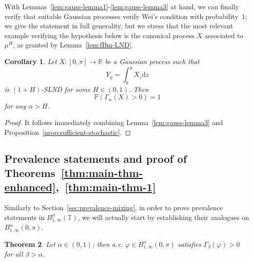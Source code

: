 \documentclass[11pt,oneside,reqno]{amsart}
\newcommand{\mathd}{\mathrm{d}}
\newtheorem{theorem}{Theorem}[section]
\newtheorem{corollary}[theorem]{Corollary}
\numberwithin{equation}{section}
\begin{document}
With Lemmas~\ref{lem:gauss-lemma1}\mbox{-}\ref{lem:gauss-lemma3}
at hand, we can finally verify that suitable Gaussian processes verify Wei's
condition with probability~$1$; we give the statement in full generality, but
we stress that the most relevant example verifying the hypothesis below is the
canonical process $X$ associated to $\mu^H$, as granted by
Lemma~\ref{lem:fBm-LND}.

\begin{corollary}
  \label{cor:gauss-wei}Let $X : [0, \pi] \rightarrow \mathbb{R}$ be a Gaussian
  process such that
  \[ Y_y = \int_0^y X_z \mathd z  \]
  is $(1 + H)$\mbox{-}SLND for some $H \in (0, 1)$. Then
  \[ \mathbb{P} (\Gamma_{\alpha} (X) > 0) = 1 \]
  for any $\alpha > H$.
\end{corollary}

\begin{proof}
  It follows immediately combining Lemma~\ref{lem:gauss-lemma3} and
  Proposition~\ref{prop:sufficient-stochastic}.
\end{proof}

\subsection{Prevalence statements and proof of
Theorems~\ref{thm:main-thm-enhanced},~\ref{thm:main-thm-1}}\label{sec:prevalence-enhanced}

Similarly to Section~\ref{sec:prevalence-mixing}, in order to
prove prevalence statements in $B^{\alpha}_{1, \infty} (\mathbb{T})$, we will
actually start by establishing their analogues on $B^{\alpha}_{1, \infty} (0,
\pi)$.

\begin{theorem}
  \label{thm:prevalence-interval-wei}Let $\alpha \in (0, 1)$; then a.e.
  $\varphi \in B^{\alpha}_{1, \infty} (0, \pi)$ satisfies $\Gamma_{\beta}
  (\varphi) > 0$ for all $\beta > \alpha$.
\end{theorem}
\end{document}
